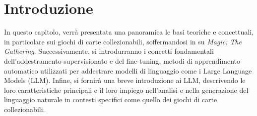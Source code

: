 \chapter{Introduzione}\label{chapter:introduction}

In questo capitolo, verrà presentata una panoramica le basi teoriche e concettuali, in particolare sui giochi di carte collezionabili, soffermandosi in su \emph{ Magic: The Gathering}. Successivamente, si introdurranno i concetti fondamentali dell'addestramento supervisionato e del fine-tuning, metodi di apprendimento automatico utilizzati per addestrare modelli di linguaggio come i Large Language Models (LLM). Infine, si fornirà una breve introduzione ai LLM, descrivendo le loro caratteristiche principali e il loro impiego nell'analisi e nella generazione del linguaggio naturale in contesti specifici come quello dei giochi di carte collezionabili.
